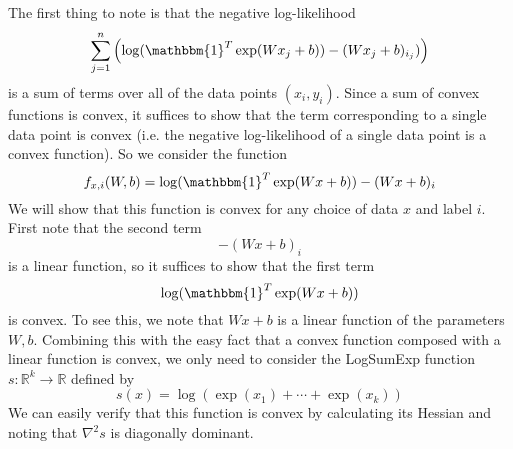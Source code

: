 The first thing to note is that the negative log-likelihood
$$\displaystyle\sum_{j=1}^n \left(\log(\mathbbm{1}^T\exp(W x_j + b)) - 
 (W x_j + b)_{i_j})\right)$$
is a sum of terms over all of the data points $(x_i,y_i)$. Since a sum of convex functions is convex, it suffices to show that
the term corresponding to a single data point is convex (i.e. the negative log-likelihood of a single data point is a convex
function). So we consider the function
\begin{equation}
 f_{x,i}(W,b) = \log(\mathbbm{1}^T\exp(W x + b)) - 
 (W x + b)_{i}
\end{equation}
We will show that this function is convex for any choice of data $x$ and label $i$. First note that the second term
$$ - (W x + b)_{i}$$
is a linear function, so it suffices to show that the first term
$$\log(\mathbbm{1}^T\exp(W x + b))$$
is convex. To see this, we note that $W x + b$ is a linear function of the parameters $W,b$. Combining
this with the easy fact that a convex function composed with a linear function is convex, we only need to consider the LogSumExp
function $s:\mathbb{R}^k\rightarrow \mathbb{R}$ defined by
\begin{equation}
 s(x) = \log(\exp(x_1) + \cdots + \exp(x_k))
\end{equation}
We can easily verify that this function is convex by calculating its Hessian and noting that $\nabla^2s$ is diagonally dominant.

